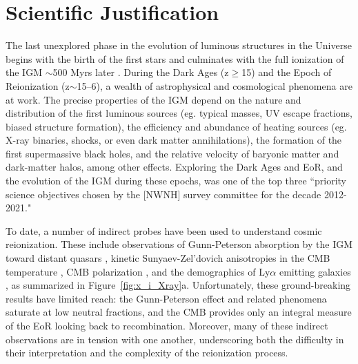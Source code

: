 \documentclass[preprint]{aastex}
\begin{document}

\vspace{-0.25in}
\section{Scientific Justification}
\label{SJsec}

The last unexplored phase in the evolution of luminous structures in the
Universe begins with the birth of the first stars and culminates with the full
ionization of the IGM $\sim$500 Myrs later
.  During the Dark Ages
(z$\ge$15) and the Epoch of Reionization (z$\sim$15--6), a wealth of
astrophysical and cosmological phenomena are at work.  The precise properties
of the IGM depend on the nature and distribution of the first luminous sources
(eg. typical masses, UV escape fractions, biased structure formation), the
efficiency and abundance of heating sources (eg.  X-ray binaries, shocks, or
even dark matter annihilations), the formation of the first supermassive black
holes, and the relative velocity of baryonic matter and dark-matter halos,
among other effects.  Exploring the Dark Ages and EoR, and the evolution of
the IGM during these epochs, was one of the top three
``priority science objectives chosen by the [NWNH] survey committee for the
decade 2012-2021."

To date, a number of indirect probes have been used to understand cosmic
reionization.  These include observations of Gunn-Peterson absorption by the
IGM toward distant quasars \citep{fan_et_al2006},
kinetic Sunyaev-Zel'dovich anisotropies in the CMB temperature \citep{zahn_et_al2012_trunc}, CMB
polarization 
\citep{page_et_al2007,planck_et_al2013}, and the
demographics of Ly$\alpha$ emitting galaxies
\citep{treu_et_al2013}, as summarized in 
Figure~\ref{fig:x_i_Xray}a.  Unfortunately,
these ground-breaking results have limited reach: the
Gunn-Peterson effect and related phenomena saturate at low neutral fractions,
and the CMB provides only an integral measure of %
the EoR looking 
back to recombination.  Moreover, many of these indirect observations are in
tension with one another, underscoring both the difficulty in their interpretation
and the complexity of the reionization process.
\end{document}
